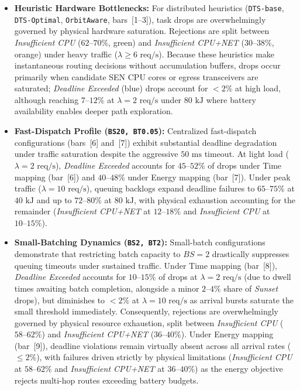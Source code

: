 \begin{itemize}
    \item \textbf{Heuristic Hardware Bottlenecks:} For distributed heuristics (\texttt{DTS-base}, \texttt{DTS-Optimal}, \texttt{OrbitAware}, bars~[1--3]), task drops are overwhelmingly governed by physical hardware saturation. Rejections are split between \textit{Insufficient CPU} ($62\text{--}70\%$, green) and \textit{Insufficient CPU+NET} ($30\text{--}38\%$, orange) under heavy traffic ($\lambda \ge 6\text{ req/s}$). Because these heuristics make instantaneous routing decisions without accumulation buffers, drops occur primarily when candidate SEN CPU cores or egress transceivers are saturated; \textit{Deadline Exceeded} (blue) drops account for $<2\%$ at high load, although reaching $7\text{--}12\%$ at $\lambda = 2\text{ req/s}$ under $80\text{ kJ}$ where battery availability enables deeper path exploration.
    \item \textbf{Fast-Dispatch Profile (\texttt{BS20, BT0.05}):} Centralized fast-dispatch configurations (bars~[6] and~[7]) exhibit substantial deadline degradation under traffic saturation despite the aggressive $50\text{ ms}$ timeout. At light load ($\lambda = 2\text{ req/s}$), \textit{Deadline Exceeded} accounts for $45\text{--}52\%$ of drops under Time mapping (bar~[6]) and $40\text{--}48\%$ under Energy mapping (bar~[7]). Under peak traffic ($\lambda = 10\text{ req/s}$), queuing backlogs expand deadline failures to $65\text{--}75\%$ at $40\text{ kJ}$ and up to $72\text{--}80\%$ at $80\text{ kJ}$, with physical exhaustion accounting for the remainder (\textit{Insufficient CPU+NET} at $12\text{--}18\%$ and \textit{Insufficient CPU} at $10\text{--}15\%$).
    \item \textbf{Small-Batching Dynamics (\texttt{BS2, BT2}):} Small-batch configurations demonstrate that restricting batch capacity to $BS = 2$ drastically suppresses queuing timeouts under sustained traffic. Under Time mapping (bar~[8]), \textit{Deadline Exceeded} accounts for $10\text{--}15\%$ of drops at $\lambda = 2\text{ req/s}$ (due to dwell times awaiting batch completion, alongside a minor $2\text{--}4\%$ share of \textit{Sunset} drops), but diminishes to $<2\%$ at $\lambda = 10\text{ req/s}$ as arrival bursts saturate the small threshold immediately. Consequently, rejections are overwhelmingly governed by physical resource exhaustion, split between \textit{Insufficient CPU} ($58\text{--}62\%$) and \textit{Insufficient CPU+NET} ($36\text{--}40\%$). Under Energy mapping (bar~[9]), deadline violations remain virtually absent across all arrival rates ($\le 2\%$), with failures driven strictly by physical limitations (\textit{Insufficient CPU} at $58\text{--}62\%$ and \textit{Insufficient CPU+NET} at $36\text{--}40\%$) as the energy objective rejects multi-hop routes exceeding battery budgets.
\end{itemize}
\FloatBarrier
